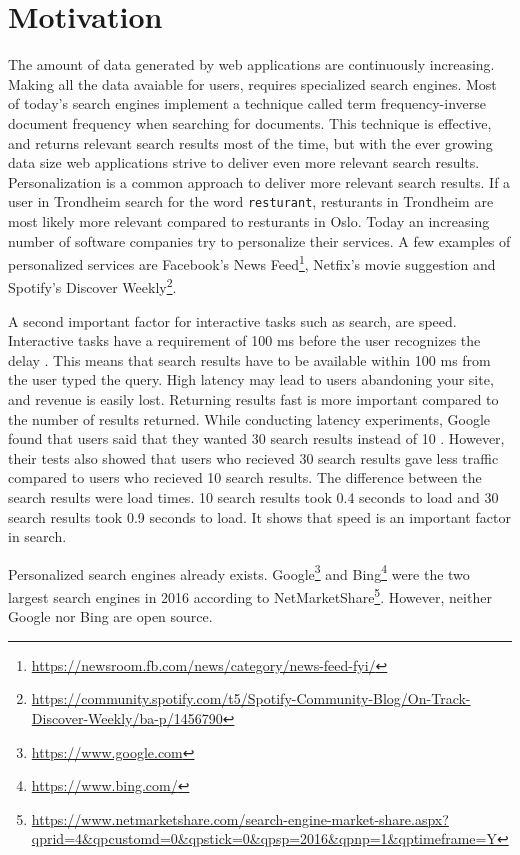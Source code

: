\section{Motivation}
The amount of data generated by web applications are continuously increasing.
Making all the data avaiable for users, requires specialized search engines.
Most of today's search engines implement a technique called term frequency-inverse document frequency when searching for documents.
This technique is effective, and returns relevant search results most of the time,
but with the ever growing data size web applications strive to deliver even more relevant search results.
Personalization is a common approach to deliver more relevant search results.
If a user in Trondheim search for the word \texttt{resturant},
resturants in Trondheim are most likely more relevant compared to resturants in Oslo.
Today an increasing number of software companies try to personalize their services.
A few examples of personalized services are Facebook's News Feed\footnote{\url{https://newsroom.fb.com/news/category/news-feed-fyi/}},
Netfix's movie suggestion \cite{netflix-recommendation} and Spotify's Discover Weekly\footnote{\url{https://community.spotify.com/t5/Spotify-Community-Blog/On-Track-Discover-Weekly/ba-p/1456790}}.

A second important factor for interactive tasks such as search, are speed.
Interactive tasks have a requirement of 100 ms before the user recognizes the delay \cite{google-latency}.
This means that search results have to be available within 100 ms from the user typed the query.
High latency may lead to users abandoning your site, and revenue is easily lost.
Returning results fast is more important compared to the number of results returned.
While conducting latency experiments, Google found that users said that they wanted 30 search results instead of 10 \cite{google-marissa}.
However,
their tests also showed that users who recieved 30 search results gave less traffic compared to users who recieved 10 search results.
The difference between the search results were load times.
10 search results took 0.4 seconds to load and 30 search results took 0.9 seconds to load.
It shows that speed is an important factor in search.

Personalized search engines already exists.
Google\footnote{\url{https://www.google.com}} and Bing\footnote{\url{https://www.bing.com/}}
were the two largest search engines in 2016 according to NetMarketShare\footnote{\url{https://www.netmarketshare.com/search-engine-market-share.aspx?qprid=4&qpcustomd=0&qpstick=0&qpsp=2016&qpnp=1&qptimeframe=Y}}.
However, neither Google nor Bing are open source.


